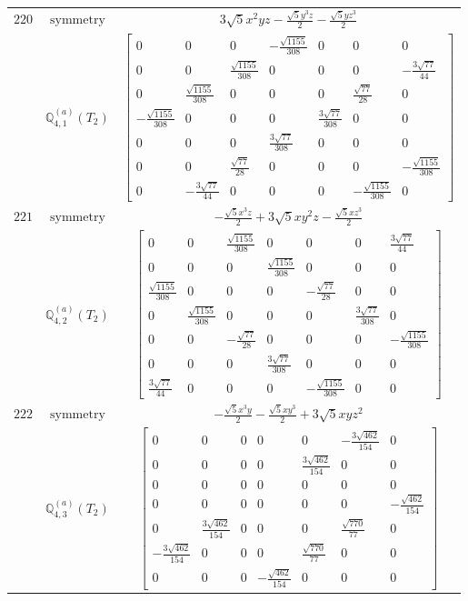 \documentclass[fleqn,8pt,landscape]{jsarticle}
\begin{document}
\begin{longtable}{ccc}
$ 220 $ & $ \text{symmetry} $ & $ 3 \sqrt{5} x^{2} y z - \frac{\sqrt{5} y^{3} z}{2} - \frac{\sqrt{5} y z^{3}}{2} $ \\
$  $ & $ \mathbb{Q}_{4,1}^{(a)}(T_{2}) $ & $ \begin{bmatrix} 0 & 0 & 0 & - \frac{\sqrt{1155}}{308} & 0 & 0 & 0 \\ 0 & 0 & \frac{\sqrt{1155}}{308} & 0 & 0 & 0 & - \frac{3 \sqrt{77}}{44} \\ 0 & \frac{\sqrt{1155}}{308} & 0 & 0 & 0 & \frac{\sqrt{77}}{28} & 0 \\ - \frac{\sqrt{1155}}{308} & 0 & 0 & 0 & \frac{3 \sqrt{77}}{308} & 0 & 0 \\ 0 & 0 & 0 & \frac{3 \sqrt{77}}{308} & 0 & 0 & 0 \\ 0 & 0 & \frac{\sqrt{77}}{28} & 0 & 0 & 0 & - \frac{\sqrt{1155}}{308} \\ 0 & - \frac{3 \sqrt{77}}{44} & 0 & 0 & 0 & - \frac{\sqrt{1155}}{308} & 0 \end{bmatrix} $ \\ \hline
$ 221 $ & $ \text{symmetry} $ & $ - \frac{\sqrt{5} x^{3} z}{2} + 3 \sqrt{5} x y^{2} z - \frac{\sqrt{5} x z^{3}}{2} $ \\
$  $ & $ \mathbb{Q}_{4,2}^{(a)}(T_{2}) $ & $ \begin{bmatrix} 0 & 0 & \frac{\sqrt{1155}}{308} & 0 & 0 & 0 & \frac{3 \sqrt{77}}{44} \\ 0 & 0 & 0 & \frac{\sqrt{1155}}{308} & 0 & 0 & 0 \\ \frac{\sqrt{1155}}{308} & 0 & 0 & 0 & - \frac{\sqrt{77}}{28} & 0 & 0 \\ 0 & \frac{\sqrt{1155}}{308} & 0 & 0 & 0 & \frac{3 \sqrt{77}}{308} & 0 \\ 0 & 0 & - \frac{\sqrt{77}}{28} & 0 & 0 & 0 & - \frac{\sqrt{1155}}{308} \\ 0 & 0 & 0 & \frac{3 \sqrt{77}}{308} & 0 & 0 & 0 \\ \frac{3 \sqrt{77}}{44} & 0 & 0 & 0 & - \frac{\sqrt{1155}}{308} & 0 & 0 \end{bmatrix} $ \\ \hline
$ 222 $ & $ \text{symmetry} $ & $ - \frac{\sqrt{5} x^{3} y}{2} - \frac{\sqrt{5} x y^{3}}{2} + 3 \sqrt{5} x y z^{2} $ \\
$  $ & $ \mathbb{Q}_{4,3}^{(a)}(T_{2}) $ & $ \begin{bmatrix} 0 & 0 & 0 & 0 & 0 & - \frac{3 \sqrt{462}}{154} & 0 \\ 0 & 0 & 0 & 0 & \frac{3 \sqrt{462}}{154} & 0 & 0 \\ 0 & 0 & 0 & 0 & 0 & 0 & 0 \\ 0 & 0 & 0 & 0 & 0 & 0 & - \frac{\sqrt{462}}{154} \\ 0 & \frac{3 \sqrt{462}}{154} & 0 & 0 & 0 & \frac{\sqrt{770}}{77} & 0 \\ - \frac{3 \sqrt{462}}{154} & 0 & 0 & 0 & \frac{\sqrt{770}}{77} & 0 & 0 \\ 0 & 0 & 0 & - \frac{\sqrt{462}}{154} & 0 & 0 & 0 \end{bmatrix} $ \\ \hline

\end{longtable}
\end{document}
